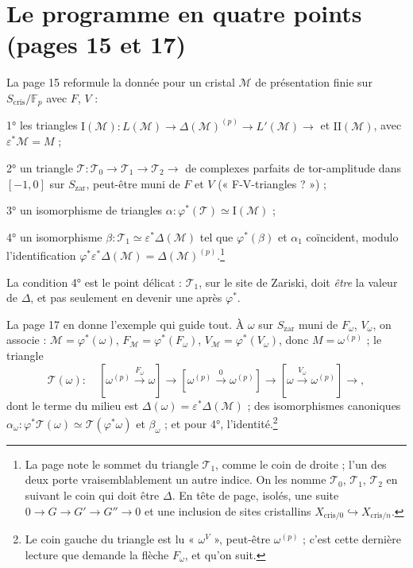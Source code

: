 \documentclass[11pt,a4paper]{article}
\begin{document}
\section*{Le programme en quatre points (pages 15 et 17)}

La page 15 reformule la donnée pour un cristal $\mathcal{M}$ de présentation
finie sur $S_{\mathrm{cris}}/\mathbb{F}_{p}$ avec $F$, $V$ :

1° les triangles $\mathrm{I}(\mathcal{M})\colon L(\mathcal{M}) \to
\Delta(\mathcal{M})^{(p)} \to L'(\mathcal{M}) \to$ et
$\mathrm{II}(\mathcal{M})$, avec $\varepsilon^{*}\mathcal{M} = M$ ;

2° un triangle $\mathcal{T}\colon \mathcal{T}_{0} \to \mathcal{T}_{1} \to
\mathcal{T}_{2} \to$ de complexes parfaits de tor-amplitude dans $[-1,0]$ sur
$S_{\mathrm{zar}}$, peut-être muni de $F$ et $V$ (« F-V-triangles ? ») ;

3° un isomorphisme de triangles $\alpha\colon \varphi^{*}(\mathcal{T}) \simeq
\mathrm{I}(\mathcal{M})$ ;

4° un isomorphisme $\beta\colon \mathcal{T}_{1} \simeq
\varepsilon^{*}\Delta(\mathcal{M})$ tel que $\varphi^{*}(\beta)$ et
$\alpha_{1}$ coïncident, modulo l'identification
$\varphi^{*}\varepsilon^{*}\Delta(\mathcal{M}) = \Delta(\mathcal{M})^{(p)}$.\footnote{La
page note le sommet du triangle $\mathcal{T}_{1}$, comme le coin de droite ;
l'un des deux porte vraisemblablement un autre indice. On les nomme
$\mathcal{T}_{0}$, $\mathcal{T}_{1}$, $\mathcal{T}_{2}$ en suivant le coin
qui doit être $\Delta$. En tête de page, isolés, une suite
$0 \to G \to G' \to G'' \to 0$ et une inclusion de sites cristallins
$X_{\mathrm{cris}/0} \hookrightarrow X_{\mathrm{cris}/n}$.}

La condition 4° est le point délicat : $\mathcal{T}_{1}$, sur le site de
Zariski, doit \emph{être} la valeur de $\Delta$, et pas seulement en devenir
une après $\varphi^{*}$.

La page 17 en donne l'exemple qui guide tout. À $\omega$ sur
$S_{\mathrm{zar}}$ muni de $F_{\omega}$, $V_{\omega}$, on associe :
$\mathcal{M} = \varphi^{*}(\omega)$, $F_{\mathcal{M}} = \varphi^{*}(F_{\omega})$,
$V_{\mathcal{M}} = \varphi^{*}(V_{\omega})$, donc $M = \omega^{(p)}$ ; le
triangle
\[
\mathcal{T}(\omega)\colon\quad
[\omega^{(p)} \xrightarrow{F_{\omega}} \omega] \longrightarrow
[\omega^{(p)} \xrightarrow{0} \omega^{(p)}] \longrightarrow
[\omega \xrightarrow{V_{\omega}} \omega^{(p)}] \longrightarrow ,
\]
dont le terme du milieu est $\Delta(\omega) = \varepsilon^{*}\Delta(\mathcal{M})$ ;
des isomorphismes canoniques $\alpha_{\omega}\colon \varphi^{*}\mathcal{T}(\omega)
\simeq \mathcal{T}(\varphi^{*}\omega)$ et $\beta_{\omega}$ ; et pour 4°,
l'identité.\footnote{Le coin gauche du triangle est lu « $\omega^{V}$ »,
peut-être $\omega^{(p)}$ ; c'est cette dernière lecture que demande la
flèche $F_{\omega}$, et qu'on suit.}
\end{document}

